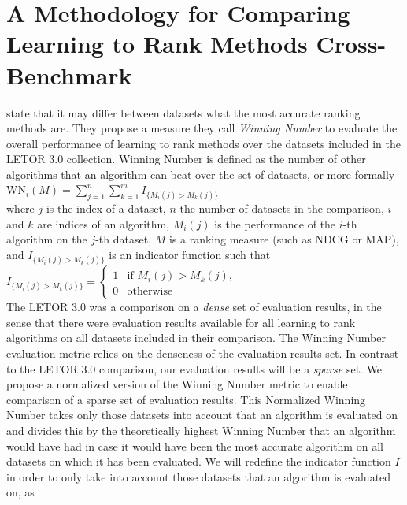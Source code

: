 \documentclass[english, authoryear, preprint]{elsarticle}
\begin{document}
\section{A Methodology for Comparing Learning to Rank Methods Cross-Benchmark}
\cite{Qin2010} state that it may differ between datasets what the most accurate ranking methods are. They propose a measure they call \emph{Winning Number} to evaluate the overall performance of learning to rank methods over the datasets included in the LETOR 3.0 collection. Winning Number is defined as the number of other algorithms that an algorithm can beat over the set of datasets, or more formally\\

$\text{WN}_i(M) = \sum\nolimits_{j=1}^n \sum\nolimits_{k=1}^m I_{\{M_i(j)>M_k(j)\}}$\\

where $j$ is the index of a dataset, $n$ the number of datasets in the comparison, $i$ and $k$ are indices of an algorithm, $M_i(j)$ is the performance of the $i$-th algorithm on the $j$-th dataset, $M$ is a ranking measure (such as NDCG or MAP), and $I_{\{M_i(j)>M_k(j)\}}$ is an indicator function such that\\

$I_{\{M_i(j)>M_k(j)\}} = \begin{cases}
1 & \text{if } M_i(j) > M_k(j), \\
0 & \text{otherwise}
\end{cases}$\\

The LETOR 3.0 was a comparison on a \emph{dense} set of evaluation results, in the sense that there were evaluation results available for all learning to rank algorithms on all datasets included in their comparison. The Winning Number evaluation metric relies on the denseness of the evaluation results set. In contrast to the LETOR 3.0 comparison, our evaluation results will be a \emph{sparse} set. We propose a normalized version of the Winning Number metric to enable comparison of a sparse set of evaluation results. This Normalized Winning Number takes only those datasets into account that an algorithm is evaluated on and divides this by the theoretically highest Winning Number that an algorithm would have had in case it would have been the most accurate algorithm on all datasets on which it has been evaluated. We will redefine the indicator function $I$ in order to only take into account those datasets that an algorithm is evaluated on, as\\
\end{document}
